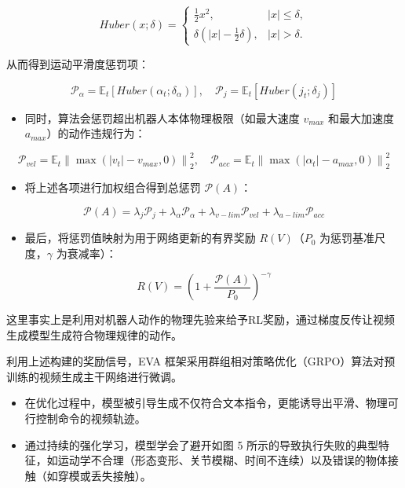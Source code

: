 \[
Huber(x;\delta)=
\begin{cases}
\frac{1}{2}x^2, & |x| \le \delta,\\
\delta\left(|x|-\frac{1}{2}\delta\right), & |x| > \delta.
\end{cases}
\]

从而得到运动平滑度惩罚项：

\[
\mathcal{P}_{\alpha} = \mathbb{E}_t[Huber(\alpha_t;\delta_{\alpha})], \quad
\mathcal{P}_{j} = \mathbb{E}_t[Huber(j_t;\delta_j)]
\]

\begin{itemize}
\tightlist
\item
  同时，算法会惩罚超出机器人本体物理极限（如最大速度 \(v_{max}\) 和最大加速度 \(a_{max}\)）的动作违规行为：
\end{itemize}

\[
\mathcal{P}_{vel} = \mathbb{E}_t\left\|\max(|v_t|-v_{max},0)\right\|_2^2, \quad
\mathcal{P}_{acc} = \mathbb{E}_t\left\|\max(|\alpha_t|-a_{max},0)\right\|_2^2
\]

\begin{itemize}
\tightlist
\item
  将上述各项进行加权组合得到总惩罚 \(\mathcal{P}(A)\)：
\end{itemize}

\[
\mathcal{P}(A) = \lambda_j\mathcal{P}_j + \lambda_{\alpha}\mathcal{P}_{\alpha} + \lambda_{v-lim}\mathcal{P}_{vel} + \lambda_{a-lim}\mathcal{P}_{acc}
\]

\begin{itemize}
\tightlist
\item
  最后，将惩罚值映射为用于网络更新的有界奖励 \(R(V)\)（\(P_0\) 为惩罚基准尺度，\(\gamma\) 为衰减率）：
\end{itemize}

\[
R(V) = \left(1 + \frac{\mathcal{P}(A)}{P_0}\right)^{-\gamma}
\]

这里事实上是利用对机器人动作的物理先验来给予RL奖励，通过梯度反传让视频生成模型生成符合物理规律的动作。

利用上述构建的奖励信号，EVA 框架采用群组相对策略优化（GRPO）算法对预训练的视频生成主干网络进行微调。

\begin{itemize}
\tightlist
\item
  在优化过程中，模型被引导生成不仅符合文本指令，更能诱导出平滑、物理可行控制命令的视频轨迹。
\item
  通过持续的强化学习，模型学会了避开如图 5 所示的导致执行失败的典型特征，如运动学不合理（形态变形、关节模糊、时间不连续）以及错误的物体接触（如穿模或丢失接触）。
\end{itemize}

